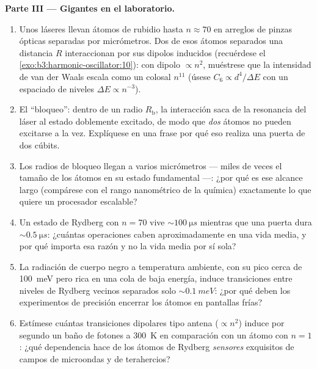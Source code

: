 \begin{problem}
\medskip\noindent\textbf{Parte III --- Gigantes en el laboratorio.}
\begin{enumerate}[resume]
  \item Unos láseres llevan átomos de rubidio hasta $n \approx 70$ en
        arreglos de pinzas ópticas separadas por micrómetros. Dos de
        esos átomos separados una distancia $R$ interaccionan por sus
        dipolos inducidos (recuérdese el \cref{exo:b3:harmonic-oscillator:10}):
        con dipolo $\propto n^2$, muéstrese que la intensidad de van der
        Waals escala como un colosal $n^{11}$ (úsese $C_6 \propto d^4/\Delta E$
        con un espaciado de niveles $\Delta E \propto n^{-3}$).
  \item El ``bloqueo'': dentro de un radio $R_{\text{b}}$, la
        interacción saca de la resonancia del láser al estado doblemente
        excitado, de modo que \emph{dos} átomos no pueden excitarse a la
        vez. Explíquese en una frase por qué eso realiza una puerta de dos
        cúbits.
  \item Los radios de bloqueo llegan a varios micrómetros --- miles de
        veces el tamaño de los átomos en su estado fundamental ---: ¿por
        qué es ese alcance largo (compárese con el rango nanométrico de
        la química) exactamente lo que quiere un procesador escalable?
  \item Un estado de Rydberg con $n = 70$ vive $\sim\qty{100}{\micro s}$
        mientras que una puerta dura $\sim\qty{0.5}{\micro s}$: ¿cuántas
        operaciones caben aproximadamente en una vida media, y por qué
        importa esa razón y no la vida media por sí sola?
  \item La radiación de cuerpo negro a temperatura ambiente, con su pico
        cerca de \qty{100}{meV} pero rica en una cola de baja energía,
        induce transiciones entre niveles de Rydberg vecinos separados
        solo $\sim\qty{0.1}{meV}$: ¿por qué deben los experimentos de
        precisión encerrar los átomos en pantallas frías?
  \item Estímese cuántas transiciones dipolares tipo antena
        ($\propto n^2$) induce por segundo un baño de fotones a
        \qty{300}{K} en comparación con un átomo con $n = 1$: ¿qué
        dependencia hace de los átomos de Rydberg \emph{sensores}
        exquisitos de campos de microondas y de terahercios?
\end{enumerate}


\end{problem}
